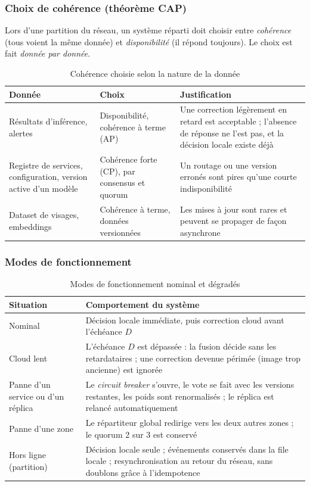 \documentclass[11pt,a4paper]{article}
\begin{document}
\subsubsection{Choix de cohérence (théorème CAP)}

Lors d'une partition du réseau, un système réparti doit choisir entre \emph{cohérence} (tous voient la même donnée) et \emph{disponibilité} (il répond toujours). Le choix est fait \emph{donnée par donnée}.

\begin{table}[h]
\centering
\begin{tabular}{|p{4.2cm}|p{2.6cm}|p{7.8cm}|}
\hline
\textbf{Donnée} & \textbf{Choix} & \textbf{Justification} \\
\hline
Résultats d'inférence, alertes & Disponibilité, cohérence à terme (AP) & Une correction légèrement en retard est acceptable ; l'absence de réponse ne l'est pas, et la décision locale existe déjà \\
\hline
Registre de services, configuration, version active d'un modèle & Cohérence forte (CP), par consensus et quorum & Un routage ou une version erronés sont pires qu'une courte indisponibilité \\
\hline
Dataset de visages, embeddings & Cohérence à terme, données versionnées & Les mises à jour sont rares et peuvent se propager de façon asynchrone \\
\hline
\end{tabular}
\caption{Cohérence choisie selon la nature de la donnée}
\end{table}

\subsubsection{Modes de fonctionnement}

\begin{table}[h]
\centering
\begin{tabular}{|p{3.3cm}|p{11.3cm}|}
\hline
\textbf{Situation} & \textbf{Comportement du système} \\
\hline
Nominal & Décision locale immédiate, puis correction cloud avant l'échéance $D$ \\
\hline
Cloud lent & L'échéance $D$ est dépassée : la fusion décide sans les retardataires ; une correction devenue périmée (image trop ancienne) est ignorée \\
\hline
Panne d'un service ou d'un réplica & Le \textit{circuit breaker} s'ouvre, le vote se fait avec les versions restantes, les poids sont renormalisés ; le réplica est relancé automatiquement \\
\hline
Panne d'une zone & Le répartiteur global redirige vers les deux autres zones ; le quorum 2 sur 3 est conservé \\
\hline
Hors ligne (partition) & Décision locale seule ; événements conservés dans la file locale ; resynchronisation au retour du réseau, sans doublons grâce à l'idempotence \\
\hline
\end{tabular}
\caption{Modes de fonctionnement nominal et dégradés}
\end{table}
\end{document}
